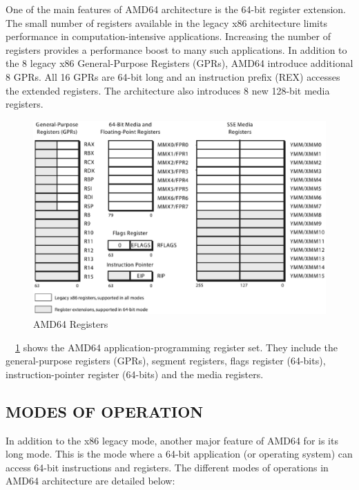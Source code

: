 One of the main features of AMD64 architecture is the 64-bit register extension. The small number of registers available in the legacy x86 architecture limits performance in computation-intensive applications. Increasing the number of registers provides a performance boost to many such applications. In addition to the 8 legacy x86 General-Purpose Registers (GPRs), AMD64 introduce additional 8 GPRs. All 16 GPRs are 64-bit long and an instruction prefix (REX) accesses the extended registers. The architecture also introduces 8 new 128-bit media registers.
\begin{figure}[h!]
\centering
\includegraphics[scale=0.65]{./figures/registers.eps}
\caption{AMD64 Registers}
\label{fig:registers.eps}
\end{figure}


~\figurename{~\ref{fig:registers.eps}} shows the AMD64 application-programming register set. They include the general-purpose registers (GPRs), segment registers, flags register (64-bits), instruction-pointer register (64-bits) and the media registers. 

\subsection{MODES OF OPERATION}
In addition to the x86 legacy mode, another major feature of AMD64 for is its long mode. This is the mode where a 64-bit application (or operating system) can access 64-bit instructions and registers.%
The different modes of operations in AMD64 architecture are detailed below:

